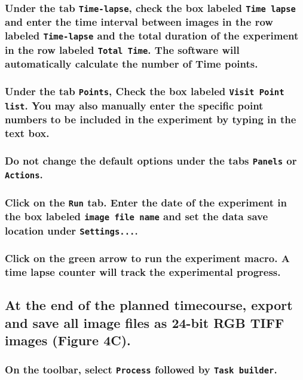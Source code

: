 \documentclass[11pt]{article}
\begin{document}
\subsubsection{{\sffamily } Under the tab \texttt{Time-lapse}, check the box labeled \texttt{Time lapse} and enter the time interval between images in the row labeled \texttt{Time-lapse} and the total duration of the experiment in the row labeled \texttt{Total Time}. The software will automatically calculate the number of Time points.}
\label{sec:orgheadline69}

\subsubsection{{\sffamily } Under the tab \texttt{Points}, Check the box labeled \texttt{Visit Point list}. You may also manually enter the specific point numbers to be included in the experiment by typing in the text box.}
\label{sec:orgheadline70}

\subsubsection{{\sffamily } Do not change the default options under the tabs \texttt{Panels} or \texttt{Actions}.}
\label{sec:orgheadline71}

\subsubsection{{\sffamily } Click on the \texttt{Run} tab. Enter the date of the experiment in the box labeled \texttt{image file name} and set the data save location under \texttt{Settings...}.}
\label{sec:orgheadline72}

\subsubsection{{\sffamily } Click on the green arrow to run the experiment macro. A time lapse counter will track the experimental progress.}
\label{sec:orgheadline73}

\subsection{{\sffamily } At the end of the planned timecourse, export and save all image files as 24-bit RGB TIFF images (\textbf{Figure 4C}).}
\label{sec:orgheadline80}

\subsubsection{{\sffamily } On the toolbar, select \texttt{Process} followed by \texttt{Task builder}.}
\label{sec:orgheadline75}
\end{document}

